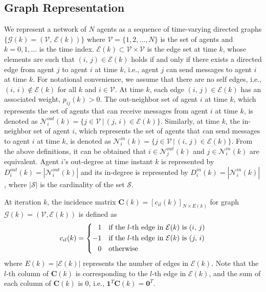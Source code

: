 \documentclass{IEEEtran}
\begin{document}

\subsection{Graph Representation}
We represent a network of $N$ agents as a sequence of time-varying directed graphs $\{\mathcal{G}(k)=(\mathcal{V}, \, \mathcal{E}(k))\}$ where $\mathcal{V}=\{1, 2, \ldots, N\}$ is the set of agents and $k=0,1,\ldots$ is the time index. $\mathcal{E}(k)\subset \mathcal{V} \times \mathcal{V}$ is the edge set at time $k$, whose elements are such that $(i, \, j) \in \mathcal{E}(k)$ holds if and only if there exists a directed edge from agent $j$ to agent $i$ at time $k$, i.e., agent $j$ can send messages to agent $i$ at time $k$. For notational convenience, we assume that there are no self edges, i.e., $(i, \, i)\notin \mathcal{E}(k)$ for all $k$ and $i\in \mathcal{V}$. At time $k$, each edge $(i, \, j) \in \mathcal{E}(k)$ has an associated weight, $p_{ij}(k)>0$. The out-neighbor set of agent $i$ at time $k$, which represents the set of agents that can receive messages from agent $i$ at time $k$, is denoted as $\mathcal{N}_i^{out}(k)=\{j \in \mathcal{V} \, | \, (j, \, i)\in \mathcal{E}(k)\}$. Similarly, at time $k$, the in-neighbor set of agent $i$, which represents the set of agents that can send messages to agent $i$ at time $k$, is denoted as $\mathcal{N}_i^{in}(k)=\{j \in \mathcal{V} \, | \, (i, \, j)\in \mathcal{E}(k)\}$. From the above definitions, it can be obtained that $i \in \mathcal{N}_j^{out}(k)$ and $j \in \mathcal{N}_i^{in}(k)$ are equivalent. Agent $i$'s out-degree at time instant $k$ is represented by $D_i^{out}(k)=|\mathcal{N}_i^{out}(k)|$ and its in-degree is represented by $D_i^{in}(k)=|\mathcal{N}_i^{in}(k)|$, where $|\mathcal{S}|$ is the cardinality of the set $\mathcal{S}$. 

At iteration $k$, the incidence matrix $\mathbf{C}(k)=[c_{il}(k)]_{N \times E(k)}$ for graph $\mathcal{G}(k)=(\mathcal{V},\mathcal{E}(k))$ is defined as
\begin{equation}
	c_{il}(k)=\left\lbrace \begin{aligned}
		1 \quad & \textnormal{if the} \ l\textnormal{-th edge in} \ \mathcal{E}(k) \ \textnormal{is} \ (i, \, j) \\
		-1 \quad & \textnormal{if the} \ l\textnormal{-th edge in} \ \mathcal{E}(k) \ \textnormal{is} \ (j, \, i) \\
		0 \quad & \textnormal{otherwise}
	\end{aligned} \right. 
\end{equation}
where $E(k)=|\mathcal{E}(k)|$ represents the number of edges in $\mathcal{E}(k)$. Note that the $l$-th column of $\mathbf{C}(k)$ is corresponding to the $l$-th edge in $\mathcal{E}(k)$, and the sum of each column of $\mathbf{C}(k)$ is $0$, i.e., $\mathbf{1}^T \mathbf{C}(k) = \mathbf{0}^T$.
\end{document}
